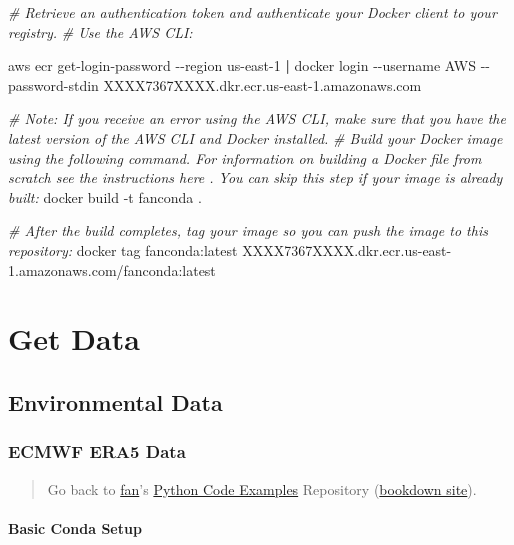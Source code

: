 \documentclass[
]{book}
\newenvironment{Shaded}{\begin{snugshade}}{\end{snugshade}}
\newcommand{\CommentTok}[1]{\textcolor[rgb]{0.56,0.35,0.01}{\textit{#1}}}
\newcommand{\ExtensionTok}[1]{#1}
\newcommand{\KeywordTok}[1]{\textcolor[rgb]{0.13,0.29,0.53}{\textbf{#1}}}
\newcommand{\NormalTok}[1]{#1}
\begin{document}
\begin{Shaded}
\begin{Highlighting}[]
\CommentTok{\# Retrieve an authentication token and authenticate your Docker client to your registry.}
\CommentTok{\# Use the AWS CLI:}

\ExtensionTok{aws}\NormalTok{ ecr get{-}login{-}password {-}{-}region us{-}east{-}1 }\KeywordTok{|} \ExtensionTok{docker}\NormalTok{ login {-}{-}username AWS {-}{-}password{-}stdin XXXX7367XXXX.dkr.ecr.us{-}east{-}1.amazonaws.com}

\CommentTok{\# Note: If you receive an error using the AWS CLI, make sure that you have the latest version of the AWS CLI and Docker installed.}
\CommentTok{\# Build your Docker image using the following command. For information on building a Docker file from scratch see the instructions here . You can skip this step if your image is already built:}
\ExtensionTok{docker}\NormalTok{ build {-}t fanconda .}

\CommentTok{\# After the build completes, tag your image so you can push the image to this repository:}
\ExtensionTok{docker}\NormalTok{ tag fanconda:latest XXXX7367XXXX.dkr.ecr.us{-}east{-}1.amazonaws.com/fanconda:latest}
\end{Highlighting}
\end{Shaded}

\hypertarget{get-data}{%
\chapter{Get Data}\label{get-data}}

\hypertarget{environmental-data}{%
\section{Environmental Data}\label{environmental-data}}

\hypertarget{ecmwf-era5-data}{%
\subsection{ECMWF ERA5 Data}\label{ecmwf-era5-data}}

\begin{quote}
Go back to \href{http://fanwangecon.github.io/}{fan}'s \href{https://fanwangecon.github.io/pyfan/}{Python Code Examples} Repository (\href{https://fanwangecon.github.io/pyfan/bookdown}{bookdown site}).
\end{quote}

\hypertarget{basic-conda-setup}{%
\subsubsection{Basic Conda Setup}\label{basic-conda-setup}}
\end{document}
